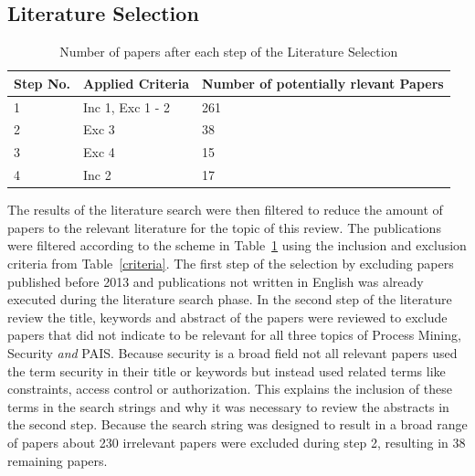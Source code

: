 \documentclass[runningheads]{llncs}
\begin{document}
\subsection{Literature Selection}\label{Selection}
\begin{table}[h!]
    \centering
    \caption{Number of papers after each step of the Literature Selection}
    \begin{tabular}{ |l|l|l|}
        \hline
        \textbf{Step No.} & \textbf{Applied Criteria} & \textbf{Number of potentially rlevant Papers} \\
        \hline
        \hline
        1                 & Inc 1, Exc 1 - 2          & 261                                           \\
        \hline
        2                 & Exc 3                     & 38                                            \\
        \hline
        3                 & Exc 4                     & 15                                            \\
        \hline
        4                 & Inc 2                     & 17                                            \\
        \hline
    \end{tabular}
    \label{selection}
\end{table}
The results of the literature search were then filtered to reduce the amount of papers to the relevant literature for the topic of this review. The publications were filtered according to the scheme in Table~\ref{selection} using the inclusion and exclusion criteria
from Table~\ref{criteria}. The first step of the selection by excluding papers published before 2013 and publications not written in English was already executed during the literature search phase.
In the second step of the literature review the title, keywords and abstract of the papers were reviewed to exclude papers that did not indicate to be relevant for all three topics of Process Mining, Security \textit{and} PAIS. Because security is a broad field not all
relevant papers used the term security in their title or keywords but instead used related terms like constraints, access control or authorization. This explains the inclusion of these terms in the search strings and why it was necessary to review the abstracts in
the second step. Because the search string was designed to result in a broad range of papers about 230 irrelevant papers were excluded during step 2, resulting in 38 remaining papers.\\
\end{document}

